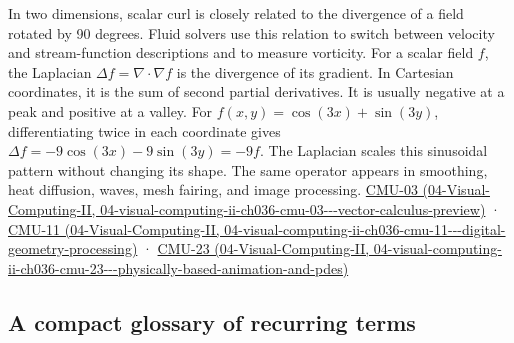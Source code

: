 In two dimensions, scalar curl is closely related to the divergence of a field rotated by 90 degrees. Fluid solvers use this relation to switch between velocity and stream-function descriptions and to measure vorticity. For a scalar field \(f\), the Laplacian \(\Delta f=\nabla\cdot\nabla f\) is the divergence of its gradient. In Cartesian coordinates, it is the sum of second partial derivatives. It is usually negative at a peak and positive at a valley. For \(f(x,y)=\cos(3x)+\sin(3y)\), differentiating twice in each coordinate gives \(\Delta f=-9\cos(3x)-9\sin(3y)=-9f\). The Laplacian scales this sinusoidal pattern without changing its shape. The same operator appears in smoothing, heat diffusion, waves, mesh fairing, and image processing. \href{../04-Visual-Computing-II/main.pdf\#nameddest=04-visual-computing-ii-ch036-cmu-03---vector-calculus-preview}{CMU-03 (04-Visual-Computing-II, 04-visual-computing-ii-ch036-cmu-03-\/-\/-vector-calculus-preview)} · \href{../04-Visual-Computing-II/main.pdf\#nameddest=04-visual-computing-ii-ch036-cmu-11---digital-geometry-processing}{CMU-11 (04-Visual-Computing-II, 04-visual-computing-ii-ch036-cmu-11-\/-\/-digital-geometry-processing)} · \href{../04-Visual-Computing-II/main.pdf\#nameddest=04-visual-computing-ii-ch036-cmu-23---physically-based-animation-and-pdes}{CMU-23 (04-Visual-Computing-II, 04-visual-computing-ii-ch036-cmu-23-\/-\/-physically-based-animation-and-pdes)}

\subsection{A compact glossary of recurring terms}\label{03-visual-computing-i-ch001-a-compact-glossary-of-recurring-terms}

